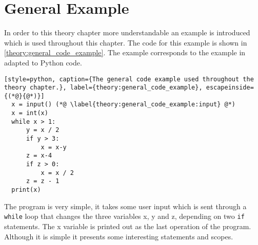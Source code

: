 \section{General Example}
In order to this theory chapter more understandable an example is introduced which is used throughout this chapter.
The code for this example is shown in \cref{theory:general_code_example}.
The example corresponds to the example in \citet{schwartzbach} adapted to Python code.
\begin{lstlisting}[style=python, caption={The general code example used throughout the theory chapter.}, label={theory:general_code_example}, escapeinside={(*@}{@*)}]
  x = input() (*@ \label{theory:general_code_example:input} @*)
  x = int(x)
  while x > 1:
      y = x / 2
      if y > 3:
          x = x-y
      z = x-4
      if z > 0:
          x = x / 2
      z = z - 1
  print(x)
\end{lstlisting}

The program is very simple, it takes some user input which is sent through a \texttt{while} loop that changes the three variables x, y and z, depending on two \texttt{if} statements.
The x variable is printed out as the last operation of the program.
Although it is simple it presents some interesting statements and scopes.
